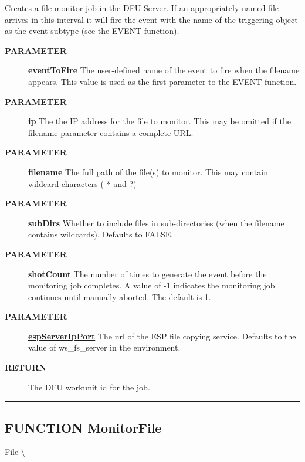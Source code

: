 \par
Creates a file monitor job in the DFU Server. If an appropriately named file arrives in this interval it will fire the event with the name of the triggering object as the event subtype (see the EVENT function).

\par
\begin{description}
\item [\colorbox{tagtype}{\color{white} \textbf{\textsf{PARAMETER}}}] \textbf{\underline{eventToFire}} The user-defined name of the event to fire when the filename appears. This value is used as the first parameter to the EVENT function.
\item [\colorbox{tagtype}{\color{white} \textbf{\textsf{PARAMETER}}}] \textbf{\underline{ip}} The the IP address for the file to monitor. This may be omitted if the filename parameter contains a complete URL.
\item [\colorbox{tagtype}{\color{white} \textbf{\textsf{PARAMETER}}}] \textbf{\underline{filename}} The full path of the file(s) to monitor. This may contain wildcard characters ( * and ?)
\item [\colorbox{tagtype}{\color{white} \textbf{\textsf{PARAMETER}}}] \textbf{\underline{subDirs}} Whether to include files in sub-directories (when the filename contains wildcards). Defaults to FALSE.
\item [\colorbox{tagtype}{\color{white} \textbf{\textsf{PARAMETER}}}] \textbf{\underline{shotCount}} The number of times to generate the event before the monitoring job completes. A value of -1 indicates the monitoring job continues until manually aborted. The default is 1.
\item [\colorbox{tagtype}{\color{white} \textbf{\textsf{PARAMETER}}}] \textbf{\underline{espServerIpPort}} The url of the ESP file copying service. Defaults to the value of ws\_fs\_server in the environment.
\item [\colorbox{tagtype}{\color{white} \textbf{\textsf{RETURN}}}] \textbf{\underline{}} The DFU workunit id for the job.
\end{description}

\rule{\linewidth}{0.5pt}
\subsection*{\textsf{\colorbox{headtoc}{\color{white} FUNCTION}
MonitorFile}}

\hypertarget{ecldoc:file.monitorfile}{}
\hspace{0pt} \hyperlink{ecldoc:File}{File} \textbackslash 

